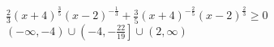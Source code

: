 {$\frac{2}{3}(x + 4)^{\frac{3}{5}}(x - 2)^{-\frac{1}{3}} + \frac{3}{5}(x + 4)^{-\frac{2}{5}}(x - 2)^{\frac{2}{3}} \geq 0$} 
{$(-\infty, -4) \cup \left(-4, -\frac{22}{19}\right] \cup (2, \infty)$}




